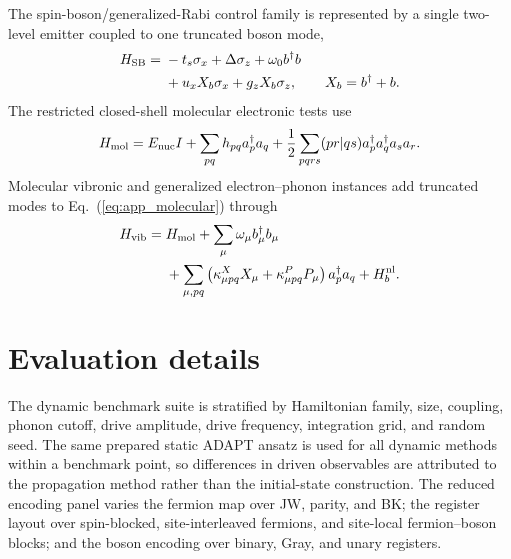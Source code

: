 \documentclass[
  reprint,
  amsmath,
  amssymb,
  aps,
  pra,
  nofootinbib,
  superscriptaddress,
  floatfix
]{revtex4-2}
\begin{document}
The spin-boson/generalized-Rabi control family is represented by a single two-level emitter coupled to one truncated boson mode,
\begin{align}
H_{\rm SB}={}&
-t_s\sigma_x+\Delta\sigma_z
+\omega_0 b^\dagger b
\nonumber\\
&
+u_xX_b\sigma_x
+g_zX_b\sigma_z,
\qquad X_b=b^\dagger+b .
\label{eq:app_spin_boson}
\end{align}
The restricted closed-shell molecular electronic tests use
\begin{equation}
H_{\rm mol}=E_{\rm nuc}I
+\sum_{pq}h_{pq}a_p^\dagger a_q
+\frac12\sum_{pqrs}(pr|qs)
a_p^\dagger a_q^\dagger a_s a_r .
\label{eq:app_molecular}
\end{equation}
Molecular vibronic and generalized electron--phonon instances add truncated modes to Eq.~(\ref{eq:app_molecular}) through
\begin{align}
H_{\rm vib}={}&H_{\rm mol}
+\sum_\mu\omega_\mu b_\mu^\dagger b_\mu
\nonumber\\
&
+\sum_{\mu,pq}
\left(\kappa^X_{\mu pq}X_\mu+\kappa^P_{\mu pq}P_\mu\right)
a_p^\dagger a_q
+H_b^{\rm nl}.
\label{eq:app_vibronic}
\end{align}

\section{Evaluation details}
\label{app:evaluation_details}

The dynamic benchmark suite is stratified by Hamiltonian family, size, coupling, phonon cutoff, drive amplitude, drive frequency, integration grid, and random seed. The same prepared static ADAPT ansatz is used for all dynamic methods within a benchmark point, so differences in driven observables are attributed to the propagation method rather than the initial-state construction. The reduced encoding panel varies the fermion map over JW, parity, and BK; the register layout over spin-blocked, site-interleaved fermions, and site-local fermion--boson blocks; and the boson encoding over binary, Gray, and unary registers.
\end{document}
